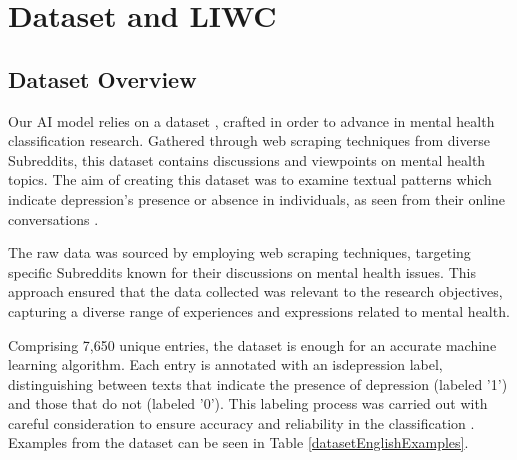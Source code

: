 \chapter{Dataset and LIWC}

\label{chap:ch3}

\par
\section{Dataset Overview}

\quad Our AI model relies on a dataset \cite{depressionDataset}, crafted in order to advance in mental health classification research. Gathered through web scraping techniques from diverse Subreddits, this dataset contains discussions and viewpoints on mental health topics. The aim of creating this dataset was to examine textual patterns which indicate depression's presence or absence in individuals, as seen from their online conversations .

The raw data was sourced by employing web scraping techniques, targeting specific Subreddits known for their discussions on mental health issues. This approach ensured that the data collected was relevant to the research objectives, capturing a diverse range of experiences and expressions related to mental health.

Comprising 7,650 unique entries, the dataset is enough for an accurate machine learning algorithm. Each entry is annotated with an is\textunderscore depression label, distinguishing between texts that indicate the presence of depression (labeled '1') and those that do not (labeled '0'). This labeling process was carried out with careful consideration to ensure accuracy and reliability in the classification \cite{depressionDataset}. Examples from the dataset can be seen in Table \ref{datasetEnglishExamples}.

